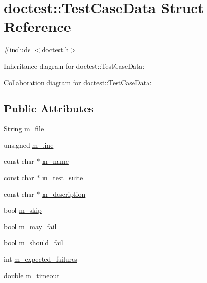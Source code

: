 \hypertarget{structdoctest_1_1TestCaseData}{}\section{doctest\+:\+:Test\+Case\+Data Struct Reference}
\label{structdoctest_1_1TestCaseData}


{\ttfamily \#include $<$doctest.\+h$>$}



Inheritance diagram for doctest\+:\+:Test\+Case\+Data\+:


Collaboration diagram for doctest\+:\+:Test\+Case\+Data\+:
\subsection*{Public Attributes}
\begin{DoxyCompactItemize}
\item 
\hyperlink{classdoctest_1_1String}{String} \hyperlink{structdoctest_1_1TestCaseData_ac3e8095418a13cd7bbc921cce5b3c5c6}{m\+\_\+file}
\item 
unsigned \hyperlink{structdoctest_1_1TestCaseData_aaabb9765e7aa39416c058a9cbccef57f}{m\+\_\+line}
\item 
const char $\ast$ \hyperlink{structdoctest_1_1TestCaseData_a0cb34895130be773e624526d68e5b2cd}{m\+\_\+name}
\item 
const char $\ast$ \hyperlink{structdoctest_1_1TestCaseData_ae264da66ff0e88a34c467d364dd18840}{m\+\_\+test\+\_\+suite}
\item 
const char $\ast$ \hyperlink{structdoctest_1_1TestCaseData_abd855851b4b9edbaf46c3458abc1ba80}{m\+\_\+description}
\item 
bool \hyperlink{structdoctest_1_1TestCaseData_a0c2353bd3fd8c2fa84d34ab4e973e038}{m\+\_\+skip}
\item 
bool \hyperlink{structdoctest_1_1TestCaseData_a887b70bf52f74724f0d7fe99d43a8783}{m\+\_\+may\+\_\+fail}
\item 
bool \hyperlink{structdoctest_1_1TestCaseData_a037f6dfb931aff9c9b17f31203a3987e}{m\+\_\+should\+\_\+fail}
\item 
int \hyperlink{structdoctest_1_1TestCaseData_a6c5995f53ad39769bf06600e562ea9eb}{m\+\_\+expected\+\_\+failures}
\item 
double \hyperlink{structdoctest_1_1TestCaseData_a8cab4a7998b486bafa81498f93dd4d91}{m\+\_\+timeout}
\end{DoxyCompactItemize}


